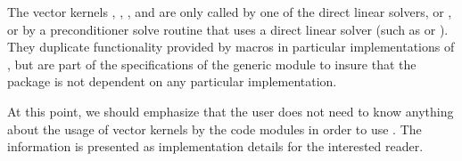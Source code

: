 The vector kernels , , , and
 are only called by one of the {\cvode} direct linear solvers, 
{\cvdense} or {\cvband}, or by a preconditioner solve routine that uses a 
direct linear solver (such as {\cvbandpre}  or {\cvbbdpre}). They duplicate 
functionality provided by macros in particular implementations of {\nvector},
but are part of the specifications of the generic {\nvector} module to insure 
that the {\cvode} package is not dependent on any particular {\nvector} implementation.

At this point, we should emphasize that the {\cvode} user does not need to know 
anything about the usage of vector kernels by the {\cvode} code modules in order 
to use {\cvode}. The information is presented as implementation details for the 
interested reader.

